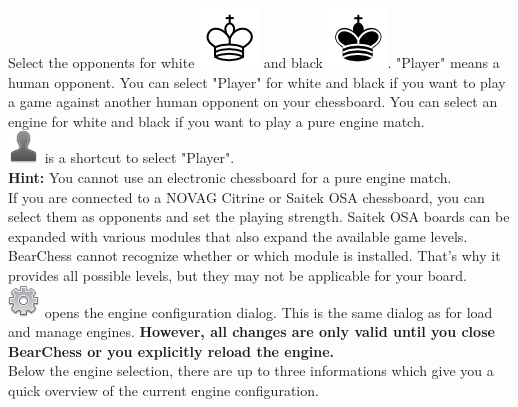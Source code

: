 \documentclass[11pt,a4paper]{article}
\begin{document}
Select the opponents for white \includegraphics[scale=0.4]{KingW.png} and black \includegraphics[scale=0.4]{KingB.png}. "Player" means a human opponent. You can select "Player" for white and black if you want to play a game against another human opponent on your chessboard. You can select an engine for white and black if you want to play a pure engine match.\\
\includegraphics[scale=0.4]{user_silhouette.png} is a shortcut to select "Player".\\
\textbf{Hint:} You cannot use an electronic chessboard for a pure engine match.\\

If you are connected to a NOVAG Citrine or Saitek OSA chessboard, you can select them as opponents and set the playing strength. Saitek OSA boards can be expanded with various modules that also expand the available game levels. BearChess cannot recognize whether or which module is installed. That's why it provides all possible levels, but they may not be applicable for your board.\\

\includegraphics[scale=0.4]{cog.png} opens the engine configuration dialog. This is the same dialog as for load and manage engines. \textbf{However, all changes are only valid until you close BearChess or you explicitly  reload the engine.}\\
Below the engine selection, there are up to three informations which give you a quick overview of the current engine configuration.
\end{document}
